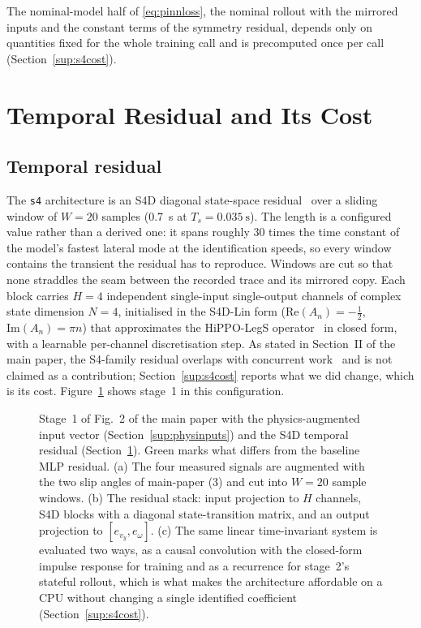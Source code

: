 The nominal-model half of \eqref{eq:pinnloss}, the nominal rollout with the
mirrored inputs and the constant terms of the symmetry residual, depends only
on quantities fixed for the whole training call and is precomputed once per
call (Section~\ref{sup:s4cost}).

\section{Temporal Residual and Its Cost}
\label{sup:s4}

\subsection{Temporal residual}
The \texttt{s4} architecture is an S4D diagonal state-space
residual~\cite{gu2022s4d} over a sliding window of $W=20$ samples
(\SI{0.7}{\second} at $T_{s}=\SI{0.035}{\second}$). The length is a
configured value rather than a derived one: it spans roughly \num{30} times the
time constant of the model's fastest lateral mode at the identification speeds,
so every window contains the transient the residual has to reproduce. Windows are cut so
that none straddles the seam between the recorded trace and its mirrored copy.
Each block carries $H=4$ independent single-input single-output channels of
complex state dimension $N=4$, initialised in the S4D-Lin form
($\mathrm{Re}(A_{n})=-\tfrac{1}{2}$, $\mathrm{Im}(A_{n})=\pi n$) that
approximates the HiPPO-LegS operator~\cite{gu2020hippo} in closed form, with a
learnable per-channel discretisation step. As stated in
Section~II of the main paper, the S4-family residual overlaps with concurrent
work~\cite{visionsysid2026} and is not claimed as a contribution;
Section~\ref{sup:s4cost} reports what we did change, which is its cost.
Figure~\ref{fig:pipelines4} shows stage~1 in this configuration.

\begin{figure}[t]
\centering
\resizebox{0.98\textwidth}{!}{}
\caption{Stage~1 of Fig.~2 of the main paper with the physics-augmented input
vector (Section~\ref{sup:physinputs}) and the S4D temporal residual
(Section~\ref{sup:s4}). Green marks what differs from the baseline MLP
residual. (a) The four measured signals are augmented with the two slip angles
of main-paper (3) and cut into $W=20$ sample windows. (b) The residual stack:
input projection to $H$ channels, S4D blocks with a diagonal state-transition
matrix, and an output projection to $[e_{v_{y}},e_{\omega}]$. (c) The same
linear time-invariant system is evaluated two ways, as a causal convolution
with the closed-form impulse response for training and as a recurrence for
stage~2's stateful rollout, which is what makes the architecture affordable on
a CPU without changing a single identified coefficient
(Section~\ref{sup:s4cost}).}
\label{fig:pipelines4}
\end{figure}

